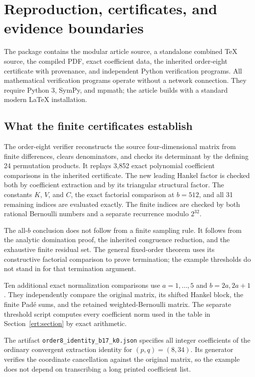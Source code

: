 \documentclass[11pt,a4paper]{article}
\numberwithin{equation}{section}
\theoremstyle{plain}
\theoremstyle{definition}
\theoremstyle{remark}
\newcommand{\src}[1]{\nolinkurl{#1}}
\begin{document}
\section{Reproduction, certificates, and evidence boundaries}
\label{sec:reproduce}

The package contains the modular article source, a standalone combined
\TeX{} source, the compiled PDF, exact coefficient data, the inherited
order-eight certificate with provenance, and independent Python
verification programs.  All mathematical verification programs operate
without a network connection.  They require Python 3, SymPy, and mpmath;
the article builds with a standard modern \LaTeX{} installation.

\subsection{What the finite certificates establish}

The order-eight verifier reconstructs the source four-dimensional
matrix from finite differences, clears denominators, and checks its
determinant by the defining 24 permutation products.  It replays
3,852 exact polynomial coefficient comparisons in the inherited
certificate.  The new leading Hankel factor is checked both by
coefficient extraction and by its triangular structural factor.
The constants $K$, $V$, and $C$, the exact factorial comparison at
$b=512$, and all 31 remaining indices are evaluated exactly.  The
finite indices are checked by both rational Bernoulli numbers and a
separate recurrence modulo $2^{32}$.

The all-$b$ conclusion does not follow from a finite sampling rule.
It follows from the analytic domination proof, the inherited
congruence reduction, and the exhaustive finite residual set.  The
general fixed-order theorem uses its constructive factorial comparison
to prove termination; the example thresholds do not stand in for
that termination argument.

Ten additional exact normalization comparisons use $a=1,\ldots,5$
and $b=2a,2a+1$.  They independently compare the original matrix,
its shifted Hankel block, the finite Pad\'e sums, and the retained
weighted-Bernoulli matrix.  The separate threshold script computes
every coefficient norm used in the table in
Section~\ref{ert:section} by exact arithmetic.

The artifact \src{order8_identity_b17_k0.json} specifies all integer
coefficients of the ordinary convergent extraction identity for
$(p,q)=(8,34)$.  Its generator verifies the coordinate cancellation
against the original matrix, so the example does not depend on
transcribing a long printed coefficient list.
\end{document}
